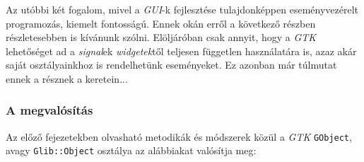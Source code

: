 \documentclass[a4paper,10pt]{article}
\begin{document}
Az utóbbi két fogalom, mivel a \textit{GUI}-k fejlesztése tulajdonképpen eseményvezérelt programozás, kiemelt fontosságú. Ennek okán erről a következő részben részletesebben is kívánunk szólni. Elöljáróban csak annyit, hogy a \textit{GTK} lehetőséget ad a \textit{signal}ek \textit{widgetek}től teljesen független használatára is, azaz akár saját osztályainkhoz is rendelhetünk eseményeket. Ez azonban már túlmutat ennek a résznek a keretein...

\subsubsection{A megvalósítás}

Az előző fejezetekben olvasható metodikák és módszerek közül a \textit{GTK} \texttt{GObject}, avagy \texttt{Glib::Object} osztálya az alábbiakat valósítja meg:
\end{document}
